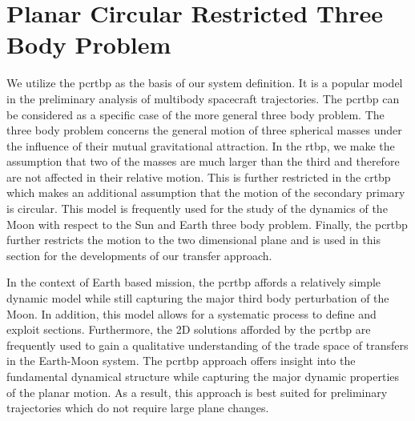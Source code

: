 \section{Planar Circular Restricted Three Body Problem}\label{sec:pcrtbp}
We utilize the \gls{pcrtbp} as the basis of our system definition. 
It is a popular model in the preliminary analysis of multibody spacecraft trajectories. 
The \gls{pcrtbp} can be considered as a specific case of the more general three body problem.
The three body problem concerns the general motion of three spherical masses under the influence of their mutual gravitational attraction.
In the \gls{rtbp}, we make the assumption that two of the masses are much larger than the third and therefore are not affected in their relative motion. 
This is further restricted in the \gls{crtbp} which makes an additional assumption that the motion of the secondary primary is circular.
This model is frequently used for the study of the dynamics of the Moon with respect to the Sun and Earth three body problem.
Finally, the \gls{pcrtbp} further restricts the motion to the two dimensional plane and is used in this section for the developments of our transfer approach.

In the context of Earth based mission, the \gls{pcrtbp} affords a relatively simple dynamic model while still capturing the major third body perturbation of the Moon.
In addition, this model allows for a systematic process to define and exploit \Poincare sections.
Furthermore, the 2D solutions afforded by the \gls{pcrtbp} are frequently used to gain a qualitative understanding of the trade space of transfers in the Earth-Moon system.
The \gls{pcrtbp} approach offers insight into the fundamental dynamical structure while capturing the major dynamic properties of the planar motion.
As a result, this approach is best suited for preliminary trajectories which do not require large plane changes.

